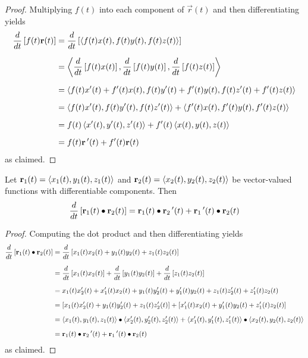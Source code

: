 \documentclass[handout]{ximera}
\begin{document}
\begin{proof}
Multiplying $f(t)$ into each component of $\vec r(t)$ and then differentiating yields
\begin{align*}
\frac{d}{dt}\left[f(t)\mathbf r(t)\right] &= \frac{d}{dt} \left[ \left\langle f(t)x(t), f(t)y(t),f(t)z(t)\right\rangle\right]\\[6pt]
&=  \left\langle \frac{d}{dt} \left[f(t)x(t)\right], \frac{d}{dt} \left[f(t)y(t)\right],\frac{d}{dt} \left[f(t)z(t)\right]\right\rangle\\[6pt]
&= \left\langle f(t)x'(t) + f'(t)x(t), f(t)y'(t) + f'(t)y(t), f(t)z'(t) + f'(t)z(t)\right\rangle\\[6pt]
&=\left\langle f(t)x'(t) , f(t)y'(t), f(t)z'(t)\right\rangle+ \left\langle f'(t)x(t), f'(t)y(t), f'(t)z(t)\right\rangle\\[6pt]
&= f(t)\left\langle x'(t), y'(t), z'(t)\right\rangle + f'(t)\left\langle x(t), y(t), z(t)\right\rangle\\[6pt]
&= f(t)\mathbf r\,'(t) + f'(t)\mathbf r(t)
\end{align*}
as claimed.
\end{proof}

\begin{proposition}
Let $\mathbf r_1(t) = \left\langle x_1(t), y_1(t),z_1(t)\right\rangle$ and $\mathbf r_2(t) = \left\langle x_2(t), y_2(t),z_2(t)\right\rangle$ be vector-valued functions with differentiable components.
Then
\[
\frac{d}{dt}\left[\mathbf r_1(t) \bullet \mathbf r_2(t)\right] = \mathbf r_1(t)\bullet \mathbf r_2\,'(t) + \mathbf r_1\,'(t)\bullet\mathbf r_2(t)
\]
\end{proposition}
\begin{proof}
Computing the dot product and then differentiating yields
\begin{align*}
\frac{d}{dt}\left[\mathbf r_1(t) \bullet \mathbf r_2(t)\right] &= \frac{d}{dt} \left[ x_1(t)x_2(t)+ y_1(t)y_2(t)+ z_1(t)z_2(t)\right]\\[6pt]
&=  \frac{d}{dt} \left[x_1(t)x_2(t)\right]+ \frac{d}{dt} \left[y_1(t)y_2(t)\right]+\frac{d}{dt} \left[z_1(t)z_2(t)\right]\\[6pt]
&= x_1(t)x_2'(t) +x_1'(t)x_2(t)+ y_1(t)y_2'(t) +y_1'(t)y_2(t)+ z_1(t)z_2'(t) +z_1'(t)z_2(t)\\[6pt]
&= \left[x_1(t)x_2'(t) + y_1(t)y_2'(t)+ z_1(t)z_2'(t)\right] + \left[x_1'(t)x_2(t)+ y_1'(t)y_2(t)+ z_1'(t)z_2(t)\right]\\[6pt]
&= \left\langle x_1(t), y_1(t), z_1(t)\right\rangle\bullet \left\langle x_2'(t), y_2'(t), z_2'(t)\right\rangle + \left\langle x_1'(t), y_1'(t), z_1'(t)\right\rangle\bullet \left\langle x_2(t), y_2(t), z_2(t)\right\rangle\\[6pt]
&= \mathbf r_1(t) \bullet \mathbf r_2\,'(t) + \mathbf r_1\,'(t) \bullet \mathbf r_2(t)
\end{align*}
as claimed.
\end{proof}
\end{document}
